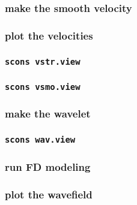 \begin{frame} \frametitle{make the smooth velocity}
\end{frame}
\cwpnote{}

\begin{frame} \frametitle{plot the velocities}
\end{frame}
\cwpnote{}

\begin{frame} \frametitle{\texttt{scons vstr.view}}
\end{frame}
\begin{frame} \frametitle{\texttt{scons vsmo.view}}
\end{frame}

\begin{frame} \frametitle{make the wavelet}
\end{frame}
\cwpnote{}

\begin{frame} \frametitle{\texttt{scons wav.view}}
\end{frame}

\begin{frame} \frametitle{run FD modeling}
\end{frame}
\cwpnote{}

\begin{frame} \frametitle{plot the wavefield}
\end{frame}
\cwpnote{}

